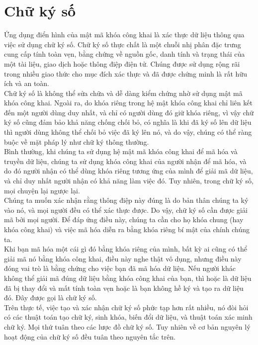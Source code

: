 \section{Chữ ký số}

Ứng dụng điển hình của mật mã khóa công khai là xác thực dữ liệu thông qua việc sử dụng chữ ký số. Chữ ký số thực chất là một chuỗi nhị phân đặc trưng cung cấp tính toàn vẹn, bằng chứng về nguồn gốc, danh tính và trạng thái của một tài liệu, giao dịch hoặc thông điệp điện tử. Chúng được sử dụng rộng rãi trong nhiều giao thức cho mục đích xác thực và đã được chứng minh là rất hữu ích và an toàn.\\

Chữ ký số là không thể sửa chữa và dễ dàng kiểm chứng nhờ sử dụng mật mã khóa công khai. Ngoài ra, do khóa riêng trong hệ mật khóa công khai chỉ liên kết đến một người dùng duy nhất, và chỉ có người dùng đó giữ khóa riêng, vì vậy chữ ký số cũng đảm bảo khả năng chống chối bỏ, có nghĩa là khi đã ký số lên dữ liệu thì người dùng không thể chối bỏ việc đã ký lên nó, và do vậy, chúng có thể ràng buộc về mặt pháp lý như chữ ký thông thường.\\

Bình thường, khi chúng ta sử dụng hệ mật mã khóa công khai để mã hóa và truyền dữ liệu, chúng ta sử dụng khóa công khai của người nhận để mã hóa, và do đó người nhận có thể dùng khóa riêng tương ứng của mình để giải mã dữ liệu, và chỉ duy nhất người nhận có khả năng làm việc đó. Tuy nhiên, trong chữ ký số, mọi chuyện lại ngược lại.\\

Chúng ta muốn xác nhận rằng thông điệp này đúng là do bản thân chúng ta ký vào nó, và mọi người đều có thể xác thực được. Do vậy, chữ ký số cần được giải mã bởi mọi người. Để đáp ứng điều này, chúng ta cần cho họ khóa chung (hay khóa công khai) và việc mã hóa diễn ra bằng khóa riêng bí mật của chính chúng ta.\\

Khi bạn mã hóa một cái gì đó bằng khóa riêng của mình, bất kỳ ai cũng có thể giải mã nó bằng khóa công khai, điều này nghe thật vô dụng, nhưng điều này đóng vai trò là bằng chứng cho việc bạn đã mã hóa dữ liệu. Nếu người khác không thể giải mã đúng dữ liệu bằng khóa công khai của bạn, thì hoặc là dữ liệu đã bị thay đổi và mất tính toàn vẹn hoặc là bạn không hề ký và tạo ra dữ liệu đó. Đây được gọi là chữ ký số.\\

Trên thực tế, việc tạo và xác nhận chữ ký số phức tạp hơn rất nhiều, nó đòi hỏi có các thuật toán tạo chữ ký, sinh khóa, biến đổi dữ liệu, và thuật toán xác minh chữ ký. Mọi thứ tuân theo các lược đồ chữ ký số. Tuy nhiên về cơ bản nguyên lý hoạt động của chữ ký số đều tuân theo nguyên tắc trên.